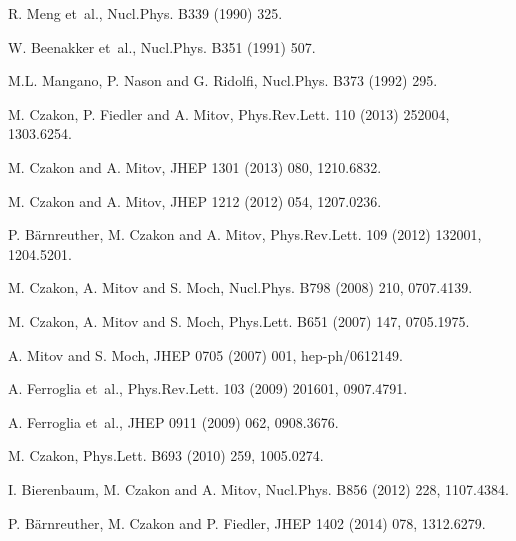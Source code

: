 \documentclass[11pt]{article}
\begin{document}
{\begin{thebibliography}{10}
R. Meng et~al.,
\newblock Nucl.Phys. B339 (1990) 325.

W. Beenakker et~al.,
\newblock Nucl.Phys. B351 (1991) 507.

M.L. Mangano, P. Nason and G. Ridolfi,
\newblock Nucl.Phys. B373 (1992) 295.

M. Czakon, P. Fiedler and A. Mitov,
\newblock Phys.Rev.Lett. 110 (2013) 252004, 1303.6254.

M. Czakon and A. Mitov,
\newblock JHEP 1301 (2013) 080, 1210.6832.

M. Czakon and A. Mitov,
\newblock JHEP 1212 (2012) 054, 1207.0236.

P. B{\"a}rnreuther, M. Czakon and A. Mitov,
\newblock Phys.Rev.Lett. 109 (2012) 132001, 1204.5201.

M. Czakon, A. Mitov and S. Moch,
\newblock Nucl.Phys. B798 (2008) 210, 0707.4139.

M. Czakon, A. Mitov and S. Moch,
\newblock Phys.Lett. B651 (2007) 147, 0705.1975.

A. Mitov and S. Moch,
\newblock JHEP 0705 (2007) 001, hep-ph/0612149.

A. Ferroglia et~al.,
\newblock Phys.Rev.Lett. 103 (2009) 201601, 0907.4791.

A. Ferroglia et~al.,
\newblock JHEP 0911 (2009) 062, 0908.3676.

M. Czakon,
\newblock Phys.Lett. B693 (2010) 259, 1005.0274.

I. Bierenbaum, M. Czakon and A. Mitov,
\newblock Nucl.Phys. B856 (2012) 228, 1107.4384.

P. B{\"a}rnreuther, M. Czakon and P. Fiedler,
\newblock JHEP 1402 (2014) 078, 1312.6279.


\end{thebibliography}}
\end{document}

